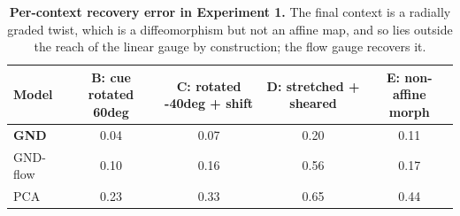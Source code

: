 \begin{table}[t]
\centering
\caption{\textbf{Per-context recovery error in Experiment 1.} The final context is a radially graded twist, which is a diffeomorphism but not an affine map, and so lies outside the reach of the linear gauge by construction; the flow gauge recovers it.}
\label{tab:hip-per-context}
\vspace{2pt}
\small
\begin{tabular}{lcccc}
\toprule
Model & B: cue rotated 60deg & C: rotated -40deg + shift & D: stretched + sheared & E: non-affine morph \\
\midrule
\textbf{GND} & 0.04 & 0.07 & 0.20 & 0.11 \\
GND-flow & 0.10 & 0.16 & 0.56 & 0.17 \\
PCA & 0.23 & 0.33 & 0.65 & 0.44 \\
\bottomrule
\end{tabular}
\end{table}
